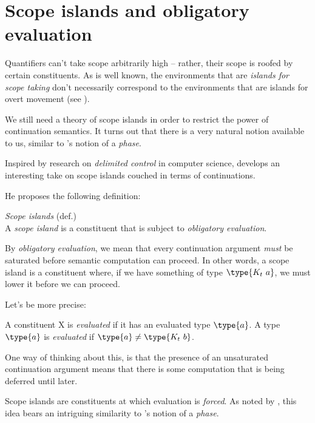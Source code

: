 \documentclass[nols,twoside,nofonts,nobib,nohyper]{tufte-handout}
\begin{document}
\section{Scope islands and obligatory evaluation}

Quantifiers can't take scope arbitrarily high -- rather, their scope is roofed
by certain constituents. As is well known, the environments that are
\textit{islands for scope taking} don't necessarily correspond to the
environments that are islands for overt movement (see \citealt{may}).

We still need a theory of scope islands in order to restrict the power of
continuation semantics. It turns out that there is a very natural notion
available to us, similar to \citeauthor{chomsky1995}'s notion of a \textit{phase}.

Inspired by research on \textit{delimited control} in computer
science,
\citet{Charlowc} develops an interesting take on scope islands couched in terms
of continuations.

He proposes the following definition:

\ex
\textit{Scope islands} (def.)\\
A \textit{scope island} is a constituent that is subject to \textit{obligatory
  evaluation}.\\
\phantom{,}\hfill\citep[p. 90]{Charlowc}
\xe

By \textit{obligatory evaluation}, we mean that every continuation argument
\textit{must} be saturated before semantic computation can proceed. In other
words, a scope island is a constituent where, if we have something of type
$\type{K_{t} a}$, we must lower it before we can proceed.

Let's be more precise:

\pex
\a A constituent X is \textit{evaluated} if it has an evaluated type $\type{a}$.
\a A type $\type{a}$ is \textit{evaluated} if $\type{a} \neq \type{K_{t} b}$.
\xe

One way of thinking about this, is that the presence of an unsaturated
continuation argument means that there is some computation that is being
deferred until later.

Scope islands are constituents at which evaluation is
\textit{forced}. As noted by \citeauthor{Charlowc}, this idea bears an
intriguing similarity to \citeauthor{chomskyPhase}'s notion of a
\textit{phase}.
\end{document}
